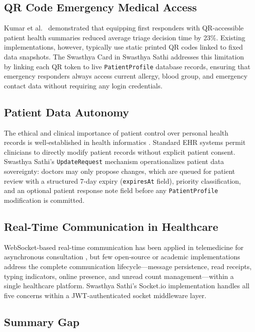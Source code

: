 \documentclass[conference]{IEEEtran}
\begin{document}
\subsection{QR Code Emergency Medical Access}

Kumar et al.~\cite{kumar2018} demonstrated that equipping first responders with QR-accessible patient health summaries reduced average triage decision time by 23\%. Existing implementations, however, typically use static printed QR codes linked to fixed data snapshots. The Swasthya Card in Swasthya Sathi addresses this limitation by linking each QR token to live \texttt{PatientProfile} database records, ensuring that emergency responders always access current allergy, blood group, and emergency contact data without requiring any login credentials.

\subsection{Patient Data Autonomy}

The ethical and clinical importance of patient control over personal health records is well-established in health informatics \cite{mandl2001}. Standard EHR systems permit clinicians to directly modify patient records without explicit patient consent. Swasthya Sathi's \texttt{UpdateRequest} mechanism operationalizes patient data sovereignty: doctors may only propose changes, which are queued for patient review with a structured 7-day expiry (\texttt{expiresAt} field), priority classification, and an optional patient response note field before any \texttt{PatientProfile} modification is committed.

\subsection{Real-Time Communication in Healthcare}

WebSocket-based real-time communication has been applied in telemedicine for asynchronous consultation \cite{baig2015}, but few open-source or academic implementations address the complete communication lifecycle—message persistence, read receipts, typing indicators, online presence, and unread count management—within a single healthcare platform. Swasthya Sathi's Socket.io implementation handles all five concerns within a JWT-authenticated socket middleware layer.

\subsection{Summary Gap}
\end{document}
